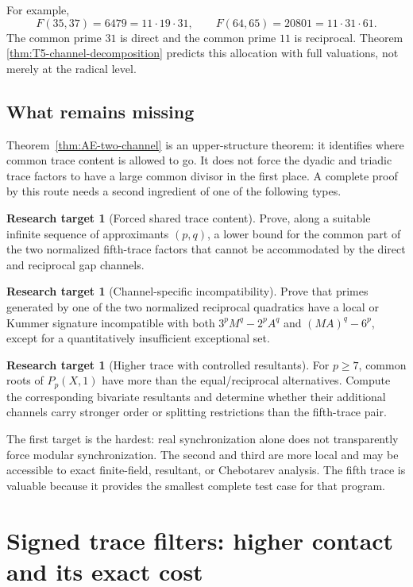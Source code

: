 \documentclass[11pt,oneside]{article}
\theoremstyle{definition}
\newtheorem{target}[theorem]{Research target}
\theoremstyle{remark}
\begin{document}
For example,
\[
 F(35,37)=6479=11\cdot19\cdot31,
 \qquad
 F(64,65)=20801=11\cdot31\cdot61.
\]
The common prime \(31\) is direct and the common prime \(11\) is reciprocal.  Theorem
\ref{thm:T5-channel-decomposition} predicts this allocation with full valuations, not merely
at the radical level.

\subsection{What remains missing}

Theorem~\ref{thm:AE-two-channel} is an upper-structure theorem: it identifies where common
trace content is allowed to go.  It does not force the dyadic and triadic trace factors to
have a large common divisor in the first place.  A complete proof by this route needs a second
ingredient of one of the following types.

\begin{target}[Forced shared trace content]
Prove, along a suitable infinite sequence of approximants \((p,q)\), a lower bound for the
common part of the two normalized fifth-trace factors that cannot be accommodated by the
direct and reciprocal gap channels.
\end{target}

\begin{target}[Channel-specific incompatibility]
Prove that primes generated by one of the two normalized reciprocal quadratics have a local
or Kummer signature incompatible with both
\(3^pM^q-2^pA^q\) and \((MA)^q-6^p\), except for a quantitatively insufficient exceptional
set.
\end{target}

\begin{target}[Higher trace with controlled resultants]
For \(p\ge7\), common roots of \(P_p(X,1)\) have more than the equal/reciprocal alternatives.
Compute the corresponding bivariate resultants and determine whether their additional
channels carry stronger order or splitting restrictions than the fifth-trace pair.
\end{target}

The first target is the hardest: real synchronization alone does not transparently force
modular synchronization.  The second and third are more local and may be accessible to exact
finite-field, resultant, or Chebotarev analysis.  The fifth trace is valuable because it
provides the smallest complete test case for that program.

\section{Signed trace filters: higher contact and its exact cost}
\label{sec:signed-filters}
\end{document}
